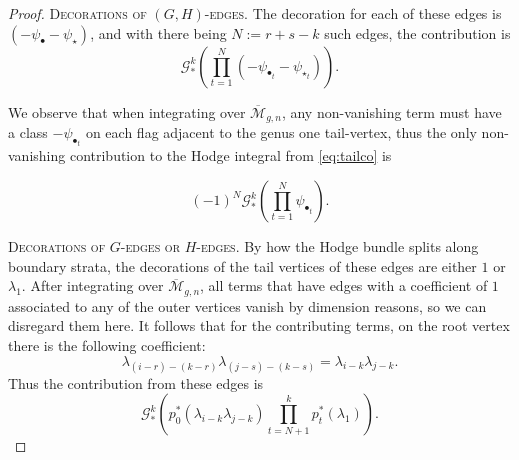 \documentclass[leqno,12pt]{amsart}
\theoremstyle{remark}
\numberwithin{equation}{section}
\begin{document}
\begin{proof}
\noindent\textsc{Decorations of $(G,H)$-edges.} The decoration for each of these edges is $(-\psi_{\bullet}-\psi_{\star})$, and with there being $N := r+s-k$ such edges, the contribution is 
\begin{equation}
\label{eq:tailco}
\mathcal{G}_*^k\left(\prod_{t=1}^{N}(-\psi_{\bullet_t} - \psi_{\star_t})\right).  
\end{equation}

We observe that when integrating over $\overline{\mathcal{M}}_{g, n}$, any non-vanishing term must have a class $-\psi_{\bullet_t}$ on each flag adjacent to the  genus one tail-vertex, thus the only non-vanishing contribution to the Hodge integral from \eqref{eq:tailco} is


\begin{equation}
(-1)^{N}\mathcal{G}_*^k\left(\prod_{t=1}^{N}\psi_{\bullet_t}\right).
\end{equation}

\noindent\textsc{Decorations of $G$-edges or $H$-edges.} By how the Hodge bundle splits along boundary  strata, the decorations of the tail vertices of these edges are either $1$ or $\lambda_1$. After integrating over $\overline{\mathcal{M}}_{g, n}$, all terms that have edges with a coefficient of $1$ associated to any of the outer vertices vanish by dimension reasons, so we can disregard them here. %
It follows that for the contributing terms, on the root vertex there is the following coefficient:
$$
\lambda_{(i-r)-(k-r)}\lambda_{(j-s)-(k-s)} = \lambda_{i-k}\lambda_{j-k}.
$$ 
Thus the contribution from these edges is
\begin{equation}
    \label{eq:onlyGonlyH}
\mathcal{G}_*^k\left(p_0^*(\lambda_{i-k}\lambda_{j-k})\prod_{t=N+1}^kp_t^\ast(\lambda_1)\right).
\end{equation}


\end{proof}
\end{document}
